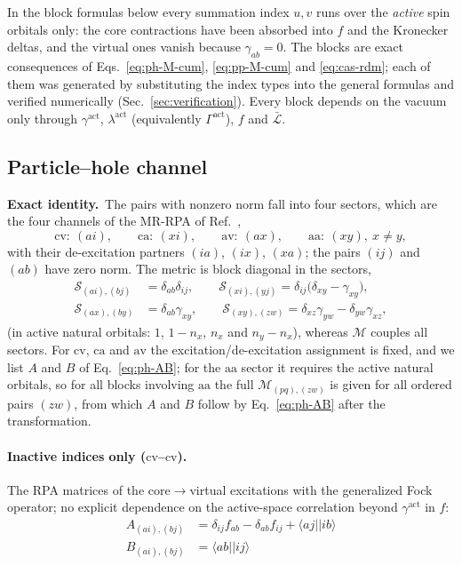 \documentclass[aip,jcp,reprint,noshowkeys,superscriptaddress]{revtex4-1}
\newcommand{\bcalM}{\boldsymbol{\mathcal M}}
\newcommand{\sLag}{\bar{\mathcal L}}
\newcommand{\act}{\mathrm{act}}
\newcommand{\scv}{\text{cv}}
\newcommand{\sca}{\text{ca}}
\newcommand{\sav}{\text{av}}
\newcommand{\saa}{\text{aa}}
\newcommand{\Exact}{\textbf{Exact identity.}\ }
\begin{document}
In the block formulas below every summation index $u,v$ runs over the
\emph{active} spin orbitals only: the core contractions have been absorbed
into $f$ and the Kronecker deltas, and the virtual ones vanish because
$\gamma_{ab}=0$.  The blocks are exact consequences of
Eqs.~\eqref{eq:ph-M-cum}, \eqref{eq:pp-M-cum} and \eqref{eq:cas-rdm}; each of
them was generated by substituting the index types into the general formulas
and verified numerically (Sec.~\ref{sec:verification}).  Every block depends
on the vacuum only through $\gamma^{\act}$, $\lambda^{\act}$ (equivalently
$\Gamma^{\act}$), $f$ and $\sLag$.

\subsection{Particle--hole channel}
\label{sec:ph-blocks}

\Exact The pairs with nonzero norm fall into four sectors, which are the four
channels of the MR-RPA of Ref.~\cite{WangFangLi2026},
\begin{equation}
  \scv:\ (ai),\qquad \sca:\ (xi),\qquad \sav:\ (ax),\qquad \saa:\ (xy),\ x\ne y ,
  \label{eq:ph-sectors}
\end{equation}
with their de-excitation partners $(ia)$, $(ix)$, $(xa)$; the pairs $(ij)$ and
$(ab)$ have zero norm.  The metric is block diagonal in the sectors,
\begin{align}
  \mathcal S_{(ai),(bj)}&=\delta_{ab}\delta_{ij},\qquad
  \mathcal S_{(xi),(yj)}=\delta_{ij}\bigl(\delta_{xy}-\gamma_{xy}\bigr),
  \nonumber\\
  \mathcal S_{(ax),(by)}&=\delta_{ab}\gamma_{xy},\qquad
  \mathcal S_{(xy),(zw)}=\delta_{xz}\gamma_{yw}-\delta_{yw}\gamma_{xz},
  \label{eq:ph-S-blocks}
\end{align}
(in active natural orbitals: $1$, $1-n_x$, $n_x$ and $n_y-n_x$), whereas
$\bcalM$ couples all sectors.  For $\scv$, $\sca$ and $\sav$ the
excitation/de-excitation assignment is fixed, and we list $A$ and $B$ of
Eq.~\eqref{eq:ph-AB}; for the $\saa$ sector it requires the active natural
orbitals, so for all blocks involving $\saa$ the full
$\mathcal M_{(pq),(zw)}$ is given for all ordered pairs $(zw)$, from which
$A$ and $B$ follow by Eq.~\eqref{eq:ph-AB} after the transformation.

\onecolumngrid
\paragraph*{Inactive indices only ($\scv$--$\scv$).}
The RPA matrices of the core$\to$virtual excitations with the generalized Fock
operator; no explicit dependence on the active-space correlation beyond
$\gamma^{\act}$ in $f$:
\begin{align}
  A_{(ai),(bj)} &= \delta_{ij}f_{ab} -\delta_{ab}f_{ij} +\langle aj||ib\rangle
  \label{eq:ph-A-cv-cv}\\
  B_{(ai),(bj)} &= \langle ab||ij\rangle
  \label{eq:ph-B-cv-cv}
\end{align}
\end{document}
